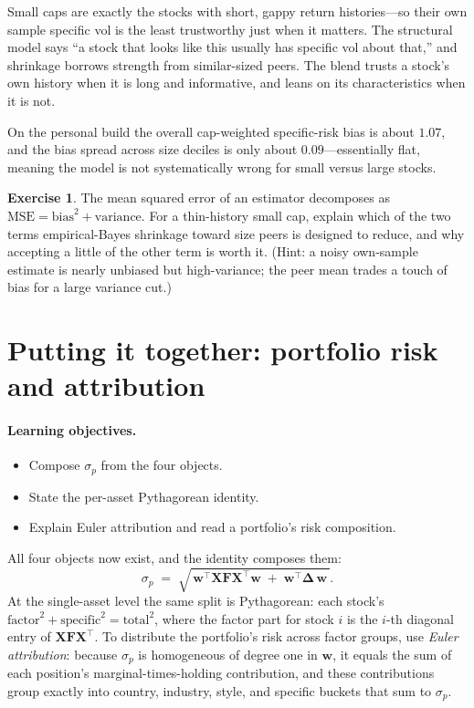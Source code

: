 \documentclass[11pt]{article}
\theoremstyle{definition}
\newtheorem{exercise}{Exercise}[section]
\theoremstyle{plain}
\theoremstyle{remark}
\newcommand{\T}{^{\!\top}}
\newcommand{\wvec}{\mathbf{w}}
\newcommand{\Xmat}{\mathbf{X}}
\newcommand{\Fmat}{\mathbf{F}}
\newcommand{\Del}{\boldsymbol{\Delta}}
\begin{document}
\begin{intuition}
Small caps are exactly the stocks with short, gappy return histories---so their own sample specific vol is the least trustworthy just when it matters. The structural model says ``a stock that looks like this usually has specific vol about that,'' and shrinkage borrows strength from similar-sized peers. The blend trusts a stock's own history when it is long and informative, and leans on its characteristics when it is not.
\end{intuition}

\begin{observed}
On the personal build the overall cap-weighted specific-risk bias is about $1.07$, and the bias spread across size deciles is only about $0.09$---essentially flat, meaning the model is not systematically wrong for small versus large stocks.
\end{observed}

\begin{exercise}
The mean squared error of an estimator decomposes as $\text{MSE}=\text{bias}^2+\text{variance}$. For a thin-history small cap, explain which of the two terms empirical-Bayes shrinkage toward size peers is designed to reduce, and why accepting a little of the other term is worth it. (Hint: a noisy own-sample estimate is nearly unbiased but high-variance; the peer mean trades a touch of bias for a large variance cut.)
\end{exercise}

\section{Putting it together: portfolio risk and attribution}\label{sec:decomp}

\paragraph{Learning objectives.}
\begin{itemize}[leftmargin=1.4em,nosep]
  \item Compose $\sigma_p$ from the four objects.
  \item State the per-asset Pythagorean identity.
  \item Explain Euler attribution and read a portfolio's risk composition.
\end{itemize}

All four objects now exist, and the identity composes them:
\[
  \sigma_p \;=\; \sqrt{\,\wvec\T \Xmat \Fmat \Xmat\T \wvec \;+\; \wvec\T \Del\, \wvec\,}.
\]
At the single-asset level the same split is Pythagorean: each stock's $\text{factor}^2 + \text{specific}^2 = \text{total}^2$, where the factor part for stock $i$ is the $i$-th diagonal entry of $\Xmat\Fmat\Xmat\T$. To distribute the portfolio's risk across factor groups, use \emph{Euler attribution}: because $\sigma_p$ is homogeneous of degree one in $\wvec$, it equals the sum of each position's marginal-times-holding contribution, and these contributions group exactly into country, industry, style, and specific buckets that sum to $\sigma_p$.
\end{document}
